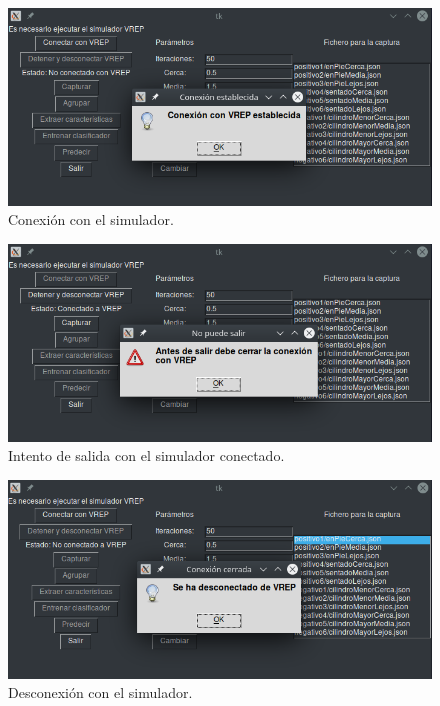 \documentclass[12pt, spanish]{article}
\begin{document}
\begin{figure}[H]
    \centering
    \includegraphics[width=\textwidth]{conexion.png}
    \caption{Conexión con el simulador.}
\end{figure}

\begin{figure}[H]
    \centering
    \includegraphics[width=\textwidth]{intento_salida.png}
    \caption{Intento de salida con el simulador conectado.}
\end{figure}

\begin{figure}[H]
    \centering
    \includegraphics[width=\textwidth]{detener_vrep.png}
    \caption{Desconexión con el simulador.}
\end{figure}
\end{document}
